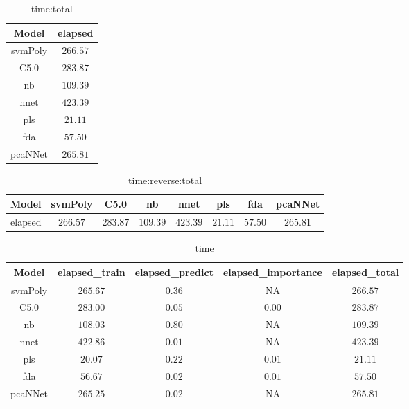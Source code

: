 \begin{table}[!ht]
	\centering
	\begin{tabular}{|c|c|}
		\hline
		Model & elapsed \\ \hline
		svmPoly & $266.57$ \\ \hline
		C5.0 & $283.87$ \\ \hline
		nb & $109.39$ \\ \hline
		nnet & $423.39$ \\ \hline
		pls & $21.11$ \\ \hline
		fda & $57.50$ \\ \hline
		pcaNNet & $265.81$ \\ \hline
	\end{tabular}
	\caption{time:total}
	\label{tab:time:total}
\end{table}

\begin{table}[!ht]
	\centering
	\begin{tabular}{|c|c|c|c|c|c|c|c|}
		\hline
		Model & svmPoly & C5.0 & nb & nnet & pls & fda & pcaNNet \\ \hline
		elapsed & $266.57$ & $283.87$ & $109.39$ & $423.39$ & $21.11$ & $57.50$ & $265.81$ \\ \hline
	\end{tabular}
	\caption{time:reverse:total}
	\label{tab:time:reverse:total}
\end{table}

\begin{table}[!ht]
	\centering
	\begin{tabular}{|c|c|c|c|c|}
		\hline
		Model & elapsed_train & elapsed_predict & elapsed_importance & elapsed_total \\ \hline
		svmPoly & $265.67$ & $0.36$ & NA & $266.57$ \\ \hline
		C5.0 & $283.00$ & $0.05$ & $0.00$ & $283.87$ \\ \hline
		nb & $108.03$ & $0.80$ & NA & $109.39$ \\ \hline
		nnet & $422.86$ & $0.01$ & NA & $423.39$ \\ \hline
		pls & $20.07$ & $0.22$ & $0.01$ & $21.11$ \\ \hline
		fda & $56.67$ & $0.02$ & $0.01$ & $57.50$ \\ \hline
		pcaNNet & $265.25$ & $0.02$ & NA & $265.81$ \\ \hline
	\end{tabular}
	\caption{time}
	\label{tab:time}
\end{table}

